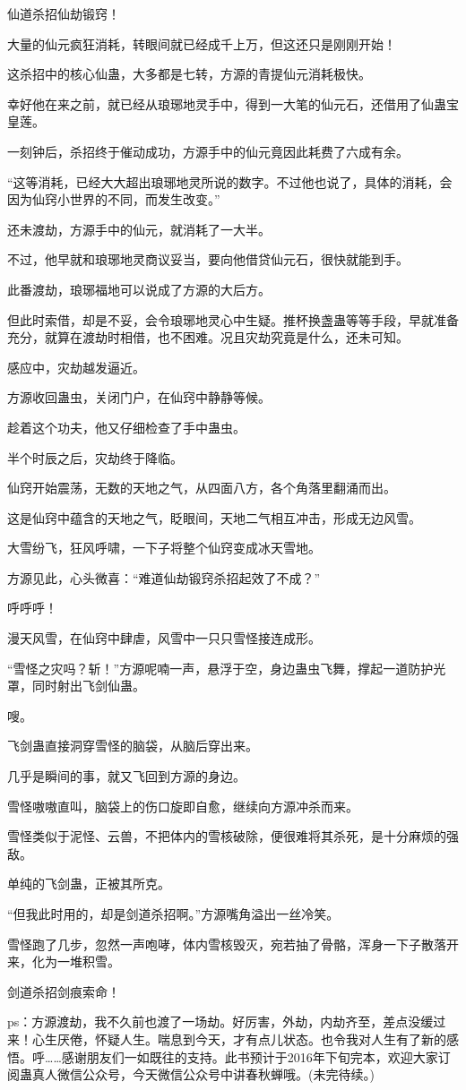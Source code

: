 \begin{this_body}
仙道杀招仙劫锻窍！

大量的仙元疯狂消耗，转眼间就已经成千上万，但这还只是刚刚开始！

这杀招中的核心仙蛊，大多都是七转，方源的青提仙元消耗极快。

幸好他在来之前，就已经从琅琊地灵手中，得到一大笔的仙元石，还借用了仙蛊宝皇莲。

一刻钟后，杀招终于催动成功，方源手中的仙元竟因此耗费了六成有余。

“这等消耗，已经大大超出琅琊地灵所说的数字。不过他也说了，具体的消耗，会因为仙窍小世界的不同，而发生改变。”

还未渡劫，方源手中的仙元，就消耗了一大半。

不过，他早就和琅琊地灵商议妥当，要向他借贷仙元石，很快就能到手。

此番渡劫，琅琊福地可以说成了方源的大后方。

但此时索借，却是不妥，会令琅琊地灵心中生疑。推杯换盏蛊等等手段，早就准备充分，就算在渡劫时相借，也不困难。况且灾劫究竟是什么，还未可知。

感应中，灾劫越发逼近。

方源收回蛊虫，关闭门户，在仙窍中静静等候。

趁着这个功夫，他又仔细检查了手中蛊虫。

半个时辰之后，灾劫终于降临。

仙窍开始震荡，无数的天地之气，从四面八方，各个角落里翻涌而出。

这是仙窍中蕴含的天地之气，眨眼间，天地二气相互冲击，形成无边风雪。

大雪纷飞，狂风呼啸，一下子将整个仙窍变成冰天雪地。

方源见此，心头微喜：“难道仙劫锻窍杀招起效了不成？”

呼呼呼！

漫天风雪，在仙窍中肆虐，风雪中一只只雪怪接连成形。

“雪怪之灾吗？斩！”方源呢喃一声，悬浮于空，身边蛊虫飞舞，撑起一道防护光罩，同时射出飞剑仙蛊。

嗖。

飞剑蛊直接洞穿雪怪的脑袋，从脑后穿出来。

几乎是瞬间的事，就又飞回到方源的身边。

雪怪嗷嗷直叫，脑袋上的伤口旋即自愈，继续向方源冲杀而来。

雪怪类似于泥怪、云兽，不把体内的雪核破除，便很难将其杀死，是十分麻烦的强敌。

单纯的飞剑蛊，正被其所克。

“但我此时用的，却是剑道杀招啊。”方源嘴角溢出一丝冷笑。

雪怪跑了几步，忽然一声咆哮，体内雪核毁灭，宛若抽了骨骼，浑身一下子散落开来，化为一堆积雪。

剑道杀招剑痕索命！

ps：方源渡劫，我不久前也渡了一场劫。好厉害，外劫，内劫齐至，差点没缓过来！心生厌倦，怀疑人生。喘息到今天，才有点儿状态。也令我对人生有了新的感悟。呼……感谢朋友们一如既往的支持。此书预计于2016年下旬完本，欢迎大家订阅蛊真人微信公众号，今天微信公众号中讲春秋蝉哦。(未完待续。)

\end{this_body}

